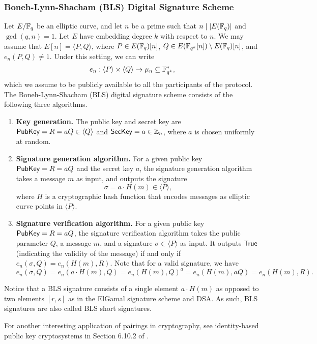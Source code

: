 \subsubsection{Boneh-Lynn-Shacham (BLS) Digital Signature Scheme}
Let $E/\mathbb{F}_q$ be an elliptic curve, and let $n$ be a prime such that 
$n \mid |E(\mathbb{F}_q)|$ and $\gcd(q, n) = 1$. Let $E$ have embedding degree $k$ 
with respect to $n$. We may assume that $E[n] = \langle P, Q \rangle$, where 
$P \in E(\mathbb{F}_q)[n]$, $Q \in E(\mathbb{F}_{q^k}[n]) \setminus E(\mathbb{F}_q)[n]$, and 
$e_n(P, Q) \neq 1$. Under this setting, we can write 
\[ e_n : \langle P \rangle \times \langle Q \rangle \to \mu_n \subseteq \mathbb{F}_{q^k}^*, \] 
which we assume to be publicly available to all the participants of the protocol. 
The Boneh-Lynn-Shacham (BLS) digital signature scheme \cite{10.1007/3-540-45682-1_30}
consists of the following three algorithms. 
\begin{enumerate}
    \item \textbf{Key generation.} The public key and secret key are 
    ${\sf PubKey} = R = aQ \in \langle Q \rangle$ and ${\sf SecKey} = a \in \mathbb{Z}_n$, where 
    $a$ is chosen uniformly at random. 
    \item \textbf{Signature generation algorithm.} For a given public key 
    ${\sf PubKey} = R = aQ$ and the secret key $a$, the signature generation algorithm 
    takes a message $m$ as input, and outputs the signature 
    \[ \sigma = a \cdot H(m) \in \langle P \rangle, \] 
    where $H$ is a cryptographic hash function that encodes messages as elliptic 
    curve points in $\langle P \rangle$.
    \item \textbf{Signature verification algorithm.} For a given public key 
    ${\sf PubKey} = R = aQ$, the signature verification algorithm takes the public 
    parameter $Q$, a message $m$, and a signature $\sigma \in \langle P \rangle$ 
    as input. It outputs ${\sf True}$ (indicating the validity of the message) if 
    and only if $e_n(\sigma, Q) = e_n(H(m), R)$. Note that for a valid signature, 
    we have 
    \[ e_n(\sigma, Q) = e_n(a \cdot H(m), Q) = e_n(H(m), Q)^a = 
    e_n(H(m), aQ) = e_n(H(m), R). \] 
\end{enumerate}
Notice that a BLS signature consists of a single element $a \cdot H(m)$ as opposed 
to two elements $[r, s]$ as in the ElGamal signature scheme and DSA. As such, 
BLS signatures are also called BLS short signatures. 

For another interesting application of pairings in cryptography, see identity-based 
public key cryptosystems in Section 6.10.2 of \cite{10.5555/1481183}.


